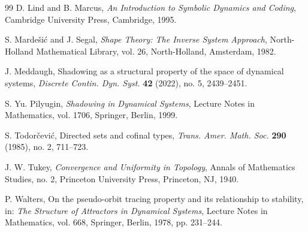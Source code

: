 \documentclass[12pt]{amsart}
\theoremstyle{definition}
\numberwithin{equation}{section}
\theoremstyle{remark}
\begin{document}
\begin{thebibliography}{99}
D. Lind and B. Marcus,
\newblock \emph{An Introduction to Symbolic Dynamics and Coding},
\newblock Cambridge University Press, Cambridge, 1995.

S. Marde\v{s}i\'c and J. Segal,
\newblock \emph{Shape Theory: The Inverse System Approach},
\newblock North-Holland Mathematical Library, vol. 26,
North-Holland, Amsterdam, 1982.

J. Meddaugh,
\newblock Shadowing as a structural property of the space of dynamical systems,
\newblock \emph{Discrete Contin. Dyn. Syst.} \textbf{42} (2022), no. 5, 2439--2451.

S. Yu. Pilyugin,
\newblock \emph{Shadowing in Dynamical Systems},
\newblock Lecture Notes in Mathematics, vol. 1706, Springer, Berlin, 1999.

S. Todor\v{c}evi\'c,
\newblock Directed sets and cofinal types,
\newblock \emph{Trans. Amer. Math. Soc.} \textbf{290} (1985), no. 2, 711--723.

J. W. Tukey,
\newblock \emph{Convergence and Uniformity in Topology},
\newblock Annals of Mathematics Studies, no. 2,
Princeton University Press, Princeton, NJ, 1940.

P. Walters,
\newblock On the pseudo-orbit tracing property and its relationship to
stability,
\newblock in: \emph{The Structure of Attractors in Dynamical Systems},
Lecture Notes in Mathematics, vol. 668, Springer, Berlin, 1978, pp. 231--244.

\end{thebibliography}
\end{document}
